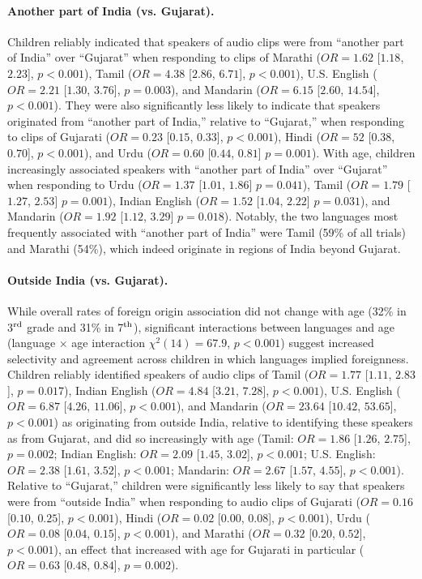 \documentclass{foushee-adapted-preprint}
\begin{document}
\paragraph{Another part of India (vs. Gujarat).} 
Children reliably indicated that speakers of audio clips were from ``another part of India'' over ``Gujarat'' when responding to clips of Marathi ($OR=1.62$ [$1.18$, $2.23$], $p<0.001$), Tamil ($OR=4.38$ [$2.86$, $6.71$], $p<0.001$), U.S. English ($OR=2.21$ [$1.30$, $3.76$], $p=0.003$), and Mandarin ($OR=6.15$ [$2.60$, $14.54$], $p<0.001$). 
They were also significantly less likely to indicate that speakers originated from ``another part of India,'' relative to ``Gujarat,'' when responding to clips of Gujarati ($OR=0.23$ [$0.15$, $0.33$], $p<0.001$), Hindi ($OR=52$ [$0.38$, $0.70$], $p<0.001$), and Urdu ($OR=0.60$ [$0.44$, $0.81$] $p=0.001$). 
With age, children increasingly associated speakers with ``another part of India'' over ``Gujarat'' when responding to Urdu ($OR=1.37$ [$1.01$, $1.86$] $p=0.041$), Tamil ($OR=1.79$ [$1.27$, $2.53$] $p=0.001$), Indian English ($OR=1.52$ [$1.04$, $2.22$] $p=0.031$), and Mandarin ($OR=1.92$ [$1.12$, $3.29$] $p=0.018$). 
Notably, the two languages most frequently associated with ``another part of India'' were Tamil (59\% of all trials) and Marathi (54\%), which indeed originate in regions of India beyond Gujarat.

\paragraph{Outside India (vs. Gujarat).}
While overall rates of foreign origin association did not change with age (32\% in 3$^{\textnormal{rd}}$ grade and 31\% in 7$^{\textnormal{th}}$), significant interactions between languages and age (language $\times$ age interaction $\chi^{2}(14)=67.9$, $p<0.001$) suggest increased selectivity and agreement across children in which languages implied foreignness.
Children reliably identified speakers of audio clips of Tamil ($OR=1.77$ [$1.11$, $2.83$], $p=0.017$), Indian English ($OR=4.84$ [$3.21$, $7.28$], $p<0.001$), U.S. English ($OR=6.87$ [$4.26$, $11.06$], $p<0.001$), and Mandarin ($OR=23.64$ [$10.42$, $53.65$], $p<0.001$) as originating from outside India, relative to identifying these speakers as from Gujarat, and did so increasingly with age (Tamil: $OR=1.86$ [$1.26$, $2.75$], $p=0.002$; Indian English: $OR=2.09$ [$1.45$, $3.02$], $p<0.001$; U.S. English: $OR=2.38$ [$1.61$, $3.52$], $p<0.001$; Mandarin: $OR=2.67$ [$1.57$, $4.55$], $p<0.001$).  
Relative to ``Gujarat,'' children were significantly less likely to say that speakers were from ``outside India'' when responding to audio clips of Gujarati ($OR=0.16$ [$0.10$, $0.25$], $p<0.001$), Hindi ($OR=0.02$ [$0.00$, $0.08$], $p<0.001$), Urdu ($OR=0.08$ [$0.04$, $0.15$], $p<0.001$), and Marathi ($OR=0.32$ [$0.20$, $0.52$], $p<0.001$), an effect that increased with age for Gujarati in particular ($OR=0.63$ [$0.48$, $0.84$], $p=0.002$). 
\end{document}
